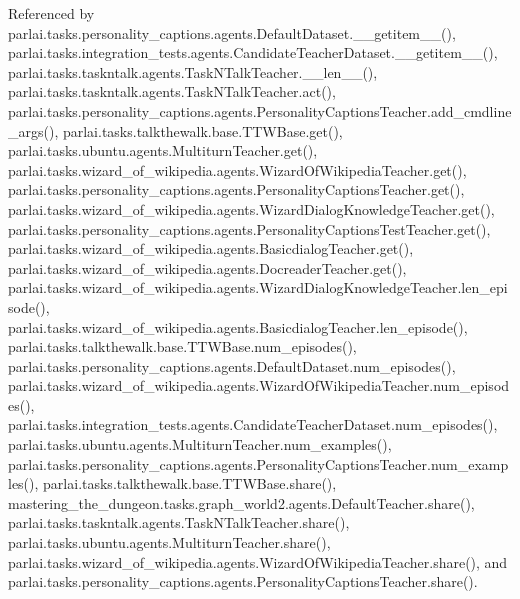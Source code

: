 Referenced by parlai.\+tasks.\+personality\+\_\+captions.\+agents.\+Default\+Dataset.\+\_\+\+\_\+getitem\+\_\+\+\_\+(), parlai.\+tasks.\+integration\+\_\+tests.\+agents.\+Candidate\+Teacher\+Dataset.\+\_\+\+\_\+getitem\+\_\+\+\_\+(), parlai.\+tasks.\+taskntalk.\+agents.\+Task\+N\+Talk\+Teacher.\+\_\+\+\_\+len\+\_\+\+\_\+(), parlai.\+tasks.\+taskntalk.\+agents.\+Task\+N\+Talk\+Teacher.\+act(), parlai.\+tasks.\+personality\+\_\+captions.\+agents.\+Personality\+Captions\+Teacher.\+add\+\_\+cmdline\+\_\+args(), parlai.\+tasks.\+talkthewalk.\+base.\+T\+T\+W\+Base.\+get(), parlai.\+tasks.\+ubuntu.\+agents.\+Multiturn\+Teacher.\+get(), parlai.\+tasks.\+wizard\+\_\+of\+\_\+wikipedia.\+agents.\+Wizard\+Of\+Wikipedia\+Teacher.\+get(), parlai.\+tasks.\+personality\+\_\+captions.\+agents.\+Personality\+Captions\+Teacher.\+get(), parlai.\+tasks.\+wizard\+\_\+of\+\_\+wikipedia.\+agents.\+Wizard\+Dialog\+Knowledge\+Teacher.\+get(), parlai.\+tasks.\+personality\+\_\+captions.\+agents.\+Personality\+Captions\+Test\+Teacher.\+get(), parlai.\+tasks.\+wizard\+\_\+of\+\_\+wikipedia.\+agents.\+Basicdialog\+Teacher.\+get(), parlai.\+tasks.\+wizard\+\_\+of\+\_\+wikipedia.\+agents.\+Docreader\+Teacher.\+get(), parlai.\+tasks.\+wizard\+\_\+of\+\_\+wikipedia.\+agents.\+Wizard\+Dialog\+Knowledge\+Teacher.\+len\+\_\+episode(), parlai.\+tasks.\+wizard\+\_\+of\+\_\+wikipedia.\+agents.\+Basicdialog\+Teacher.\+len\+\_\+episode(), parlai.\+tasks.\+talkthewalk.\+base.\+T\+T\+W\+Base.\+num\+\_\+episodes(), parlai.\+tasks.\+personality\+\_\+captions.\+agents.\+Default\+Dataset.\+num\+\_\+episodes(), parlai.\+tasks.\+wizard\+\_\+of\+\_\+wikipedia.\+agents.\+Wizard\+Of\+Wikipedia\+Teacher.\+num\+\_\+episodes(), parlai.\+tasks.\+integration\+\_\+tests.\+agents.\+Candidate\+Teacher\+Dataset.\+num\+\_\+episodes(), parlai.\+tasks.\+ubuntu.\+agents.\+Multiturn\+Teacher.\+num\+\_\+examples(), parlai.\+tasks.\+personality\+\_\+captions.\+agents.\+Personality\+Captions\+Teacher.\+num\+\_\+examples(), parlai.\+tasks.\+talkthewalk.\+base.\+T\+T\+W\+Base.\+share(), mastering\+\_\+the\+\_\+dungeon.\+tasks.\+graph\+\_\+world2.\+agents.\+Default\+Teacher.\+share(), parlai.\+tasks.\+taskntalk.\+agents.\+Task\+N\+Talk\+Teacher.\+share(), parlai.\+tasks.\+ubuntu.\+agents.\+Multiturn\+Teacher.\+share(), parlai.\+tasks.\+wizard\+\_\+of\+\_\+wikipedia.\+agents.\+Wizard\+Of\+Wikipedia\+Teacher.\+share(), and parlai.\+tasks.\+personality\+\_\+captions.\+agents.\+Personality\+Captions\+Teacher.\+share().

\mbox{\label{classparlai_1_1tasks_1_1integration__tests_1_1agents_1_1CandidateTeacherDataset_ad84468c9ea14c769e327644bbc1a4998}} 
